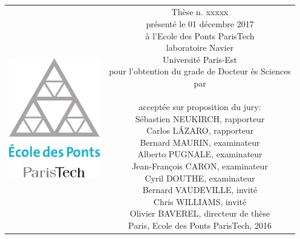 \begin{titlepage}
\begin{center}
\sffamily


\null\vspace{2cm}
{\huge \mytitle} \\[24pt] 
    
\vfill

\begin{tabular} {cc}
\parbox{0.3\textwidth}{\includegraphics[width=4cm]{head/logo_enpc}}
&
\parbox{0.7\textwidth}{%
	Thèse n. xxxxx\\
	présenté le 01 décembre 2017\\
	à l'Ecole des Ponts ParisTech\\
	laboratoire Navier\\
%
	Université Paris-Est\\[6pt]
	pour l'obtention du grade de Docteur ès Sciences\\
	par\\ [4pt]
	\null \hspace{3em} \myauthor\\[9pt]
%
\small
acceptée sur proposition du jury:\\[4pt]
%
    Sébastien NEUKIRCH, rapporteur\\
    Carlos LÁZARO, rapporteur\\
    Bernard MAURIN, examinateur\\
    Alberto PUGNALE, examinateur\\
    Jean-François CARON, examinateur\\
    Cyril DOUTHE, examinateur\\
    Bernard VAUDEVILLE, invité\\
    Chris WILLIAMS, invité\\
    Olivier BAVEREL, directeur de thèse\\[12pt]
%
Paris, Ecole des Ponts ParisTech, 2016}
\end{tabular}
\end{center}
\vspace{2cm}
\end{titlepage}



